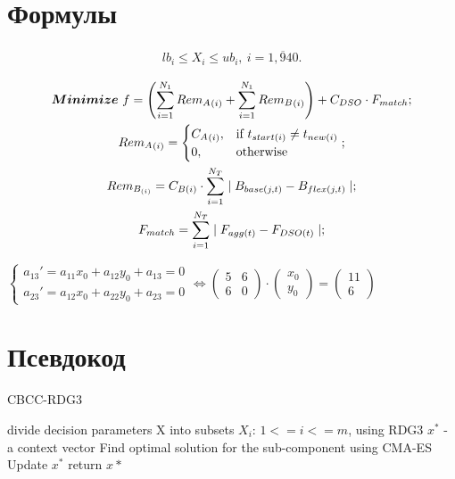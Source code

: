     \section{Формулы}
        \begin{gather}
            lb_i \leq X_i \leq ub_i,\   i = \overline{1, 940}.\label{eq:1}
        \end{gather}

        \begin{gather}
            \arraycolsep=1.4pt\def\arraystretch{1.8}
            \boldsymbol{Minimize}\ f = \left ( \sum_{i=1}^{N_1} {{Rem_A}_{(i)}} + \sum_{i=1}^{N_1} {Rem_B}_{(i)}\right) + C_{DSO} \cdot F_{match};\label{eq:2}\\
            {Rem_A}_{(i)} =   \begin{cases}
                {C_A}_{(i)},  & \mbox{if } t_{start(i)} \neq t_{new(i)} \\
                0, & \mbox{otherwise}
                            \end{cases};\label{eq:3}\\
            Rem_{B_{(i)}} = C_{B(i)} \cdot \sum_{i=1}^{N_T} \mid B_{base(j, t)} - B_{flex(j, t)} \mid ; \label{eq:4} \\
            F_{match} = \sum_{i=1}^{N_T} \mid F_{agg(t)} - F_{DSO(t)}\mid ; \label{eq:5} 
        \end{gather}


        $
        \begin{cases}
        a_{13}' = a_{11} x_0 + a_{12} y_0 + a_{13} = 0\\
        a_{23}' = a_{12} x_0 + a_{22}y_0 + a_{23} = 0
        \end{cases} \Longleftrightarrow
        \begin{pmatrix}
        5 & 6 \\
        6 & 0 
        \end{pmatrix} \cdot \begin{pmatrix}
        x_0 \\ 
        y_0
        \end{pmatrix} = 
        \begin{pmatrix}
        11 \\ 
        6
        \end{pmatrix}
        $

    \section{Псевдокод}
        \begin{algorithm}
            \caption{CBCC-RDG3}\label{alg:CBCC-RDG3}
            \begin{algorithmic}[1]
            \State divide decision parameters X into subsets $X_i$: $1 <= i <= m$, using RDG3
            \State $x^{*}$ - a context vector
            \State Find optimal solution for the sub-component using CMA-ES
            \State Update $x^{*}$
            \EndFor
            \EndFor
            \State return $x*$
            \end{algorithmic}
        \end{algorithm}

